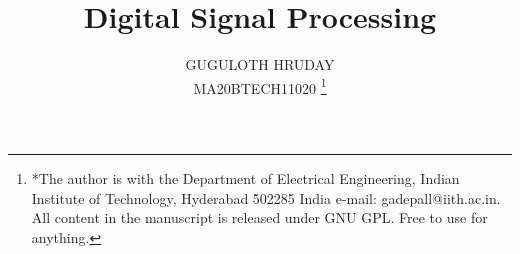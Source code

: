 \documentclass[journal,12pt,twocolumn]{IEEEtran}
\begin{document}

\def\putbox#1#2#3{\makebox[0in][l]{\makebox[#1][l]{}\raisebox{\baselineskip}[0in][0in]{\raisebox{#2}[0in][0in]{#3}}}}
     \def\rightbox#1{\makebox[0in][r]{#1}}
     \def\centbox#1{\makebox[0in]{#1}}
     \def\topbox#1{\raisebox{-\baselineskip}[0in][0in]{#1}}
     \def\midbox#1{\raisebox{-0.5\baselineskip}[0in][0in]{#1}}

\vspace{3cm}

\title{ 
Digital Signal Processing
}


%
%
%

\author{ GUGULOTH HRUDAY %
\\MA20BTECH11020
\thanks{*The author is with the Department
of Electrical Engineering, Indian Institute of Technology, Hyderabad
502285 India e-mail:  gadepall@iith.ac.in.  All content in the manuscript is 
released under GNU GPL.  Free to use for anything. }%
}
% 
%
\end{document}
